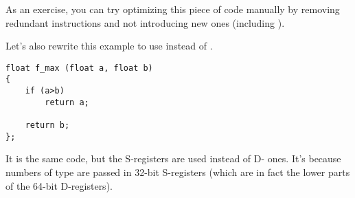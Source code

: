 \mysubparagraph{\Exercise}

As an exercise, you can try optimizing this piece of code 
manually by removing redundant instructions and not introducing new ones (including ).


Let's also rewrite this example to use \Tfloat instead of \Tdouble.

\begin{lstlisting}[style=customc]
float f_max (float a, float b)
{
	if (a>b)
		return a;

	return b;
};
\end{lstlisting}



It is the same code, but the S-registers are used instead of D- ones.
It's because numbers of type \Tfloat are passed in 32-bit S-registers (which are in fact the lower parts of the 64-bit D-registers).

